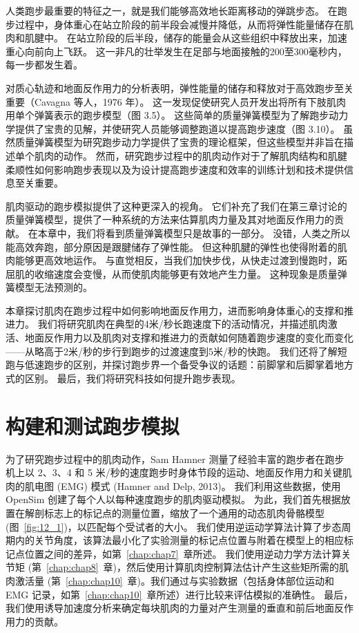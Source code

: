 人类跑步最重要的特征之一，就是我们能够高效地长距离移动的弹跳步态。
在跑步过程中，身体重心在站立阶段的前半段会减慢并降低，从而将弹性能量储存在肌肉和肌腱中。
在站立阶段的后半段，储存的能量会从这些组织中释放出来，加速重心向前向上飞跃。
这一非凡的壮举发生在足部与地面接触的200至300毫秒内，每一步都发生着。


对质心轨迹和地面反作用力的分析表明，弹性能量的储存和释放对于高效跑步至关重要（Cavagna 等人，1976 年）。
这一发现促使研究人员开发出将所有下肢肌肉用单个弹簧表示的跑步模型（图 3.5）。
这些简单的质量弹簧模型为了解跑步动力学提供了宝贵的见解，并使研究人员能够调整跑道以提高跑步速度（图 3.10）。
虽然质量弹簧模型为研究跑步动力学提供了宝贵的理论框架，但这些模型并非旨在描述单个肌肉的动作。
然而，研究跑步过程中的肌肉动作对于了解肌肉结构和肌腱柔顺性如何影响跑步表现以及为设计提高跑步速度和效率的训练计划和技术提供信息至关重要。


肌肉驱动的跑步模拟提供了这种更深入的视角。
它们补充了我们在第三章讨论的质量弹簧模型，提供了一种系统的方法来估算肌肉力量及其对地面反作用力的贡献。
在本章中，我们将看到质量弹簧模型只是故事的一部分。
没错，人类之所以能高效奔跑，部分原因是跟腱储存了弹性能。
但这种肌腱的弹性也使得附着的肌肉能够更高效地运作。
与直觉相反，当我们加快步伐，从快走过渡到慢跑时，跖屈肌的收缩速度会变慢，从而使肌肉能够更有效地产生力量。
这种现象是质量弹簧模型无法预测的。


本章探讨肌肉在跑步过程中如何影响地面反作用力，进而影响身体重心的支撑和推进力。
我们将研究肌肉在典型的4米/秒长跑速度下的活动情况，并描述肌肉激活、地面反作用力以及肌肉对支撑和推进力的贡献如何随着跑步速度的变化而变化——从略高于2米/秒的步行到跑步的过渡速度到5米/秒的快跑。
我们还将了解短跑与低速跑步的区别，并探讨跑步界一个备受争议的话题：前脚掌和后脚掌着地方式的区别。
最后，我们将研究科技如何提升跑步表现。


\section{构建和测试跑步模拟}

为了研究跑步过程中的肌肉动作，Sam Hamner 测量了经验丰富的跑步者在跑步机上以 2、3、4 和 5 米/秒的速度跑步时身体节段的运动、地面反作用力和关键肌肉的肌电图 (EMG) 模式 (Hamner and Delp, 2013)。
我们利用这些数据，使用 OpenSim 创建了每个人以每种速度跑步的肌肉驱动模拟。
为此，我们首先根据放置在解剖标志上的标记点的测量位置，缩放了一个通用的动态肌肉骨骼模型 (图~\ref{fig:12_1})，以匹配每个受试者的大小。
我们使用逆运动学算法计算了步态周期内的关节角度，该算法最小化了实验测量的标记点位置与附着在模型上的相应标记点位置之间的差异，如第~\ref{chap:chap7}~章所述。
我们使用逆动力学方法计算关节矩 (第~\ref{chap:chap8}~章)，然后使用计算肌肉控制算法估计产生这些矩所需的肌肉激活量 (第~\ref{chap:chap10}~章)。我们通过与实验数据（包括身体部位运动和 EMG 记录，如第~\ref{chap:chap10}~章所述）进行比较来评估模拟的准确性。
最后，我们使用诱导加速度分析来确定每块肌肉的力量对产生测量的垂直和前后地面反作用力的贡献。


